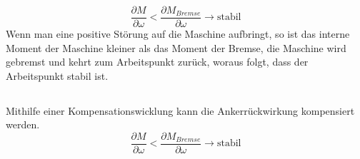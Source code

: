 \documentclass[11pt,a4paper]{scrartcl}
\newcommand{\0}{_{\mybr{0}}}
\newcommand{\1}{_{\mybr{1}}}
\newcommand{\2}{_{\mybr{2}}}
\begin{document}
\subsubsection{}
\begin{equation}
\frac{\partial M}{\partial\omega}<\frac{\partial M_{Bremse}}{\partial\omega}\rightarrow \text{stabil}
\end{equation}
Wenn man eine positive Störung auf die Maschine aufbringt, so ist das interne Moment der Maschine kleiner als das Moment der Bremse, die Maschine wird gebremst und kehrt zum Arbeitspunkt zurück, woraus folgt, dass der Arbeitspunkt stabil ist.

\subsection{}
Mithilfe einer Kompensationswicklung kann die Ankerrückwirkung kompensiert werden.
\begin{equation}
\frac{\partial M}{\partial\omega}<\frac{\partial M_{Bremse}}{\partial\omega}\rightarrow \text{stabil}
\end{equation}

\section{}
\end{document}
